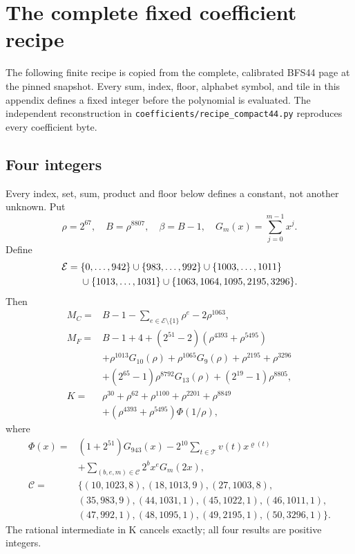 \section{The complete fixed coefficient recipe}\label{sec:constants}
The following finite recipe is copied from the complete, calibrated BFS44 page at the pinned snapshot. Every sum, index, floor, alphabet symbol, and tile in this appendix defines a fixed integer before the polynomial is evaluated. The independent reconstruction in \texttt{coefficients/recipe\_compact44.py} reproduces every coefficient byte.
\subsection*{Four integers}
Every index, set, sum, product and floor below defines a constant, not
another unknown. Put
\[
\rho=2^{67},\quad B=\rho^{8807},\quad\beta=B-1,\quad
G_m(x)=\sum_{j=0}^{m-1}x^j.
\]
Define
\[
\begin{split}
\mathcal E={}&\{0,\ldots,942\}\cup\{983,\ldots,992\}\cup\{1003,\ldots,1011\}\\
&\cup\{1013,\ldots,1031\}\cup\{1063,1064,1095,2195,3296\}.
\end{split}
\]
Then
\begin{align*}
M_C={}&B-1-\sum_{e\in\mathcal E\setminus\{1\}}\rho^e-2\rho^{1063},\\
M_F={}&B-1+4+(2^{51}-2)(\rho^{4393}+\rho^{5495})\\
&+\rho^{1013}G_{10}(\rho)+\rho^{1065}G_9(\rho)
  +\rho^{2195}+\rho^{3296}\\
&+(2^{65}-1)\rho^{8792}G_{13}(\rho)+(2^{19}-1)\rho^{8805},\\
K={}&\rho^{30}+\rho^{62}+\rho^{1100}+\rho^{2201}+\rho^{8849}\\
&+(\rho^{4393}+\rho^{5495})\Phi(1/\rho),
\end{align*}
where
\[
\begin{split}
\Phi(x)={}&(1+2^{51})G_{943}(x)
 -2^{10}\sum_{t\in\mathcal T}v(t)x^{\varrho(t)}\\
&+\sum_{(b,e,m)\in\mathcal C}2^b x^e G_m(2x),\\
\mathcal C={}&\{(10,1023,8),(18,1013,9),(27,1003,8),\\
&(35,983,9),(44,1031,1),(45,1022,1),(46,1011,1),\\
&(47,992,1),(48,1095,1),(49,2195,1),(50,3296,1)\}.
\end{split}
\]
The rational intermediate in K cancels exactly; all four results are positive integers.

